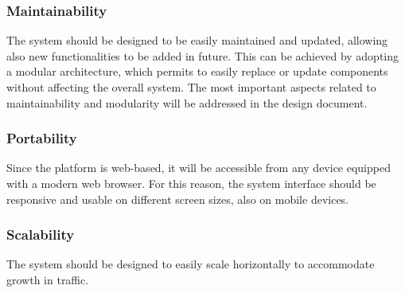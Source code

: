 \subsubsection{Maintainability}
The system should be designed to be easily maintained and updated, allowing also new functionalities to be added in future. This can be achieved by adopting a modular architecture, which permits to easily replace or update components without affecting the overall system. The most important aspects related to maintainability and modularity will be addressed in the design document.
\subsubsection{Portability}
Since the platform is web-based, it will be accessible from any device equipped with a modern web browser. For this reason, the system interface should be responsive and usable on different screen sizes, also on mobile devices.

\subsubsection{Scalability}
The system should be designed to easily scale horizontally to accommodate growth in traffic.
